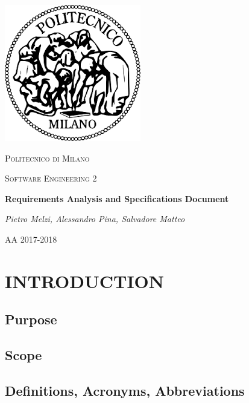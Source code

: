 \documentclass[11pt]{report}
\begin{document}
	\begin{titlepage}
		\centering
		\includegraphics{logo.png}\par\vspace{1cm}
		{\scshape\LARGE Politecnico di Milano \par}
		\vspace{1cm}
		{\scshape\Large Software Engineering 2\par}
		\vspace{1.5cm}
		{\huge\bfseries Requirements Analysis and Specifications Document\par}
		\vspace{2cm}
		{\Large\itshape Pietro Melzi, Alessandro Pina, Salvadore Matteo\par}

		\vfill

		{\large AA 2017-2018\par}
	\end{titlepage}

	\tableofcontents{}

	\chapter{INTRODUCTION}
	\label{ch:INTRODUCTION}
	
		\section{Purpose}
		\label{sect:Purpose}
			
			
		\section{Scope}
		\label{sect:Scope}
			
			
			
		\section{Definitions, Acronyms, Abbreviations}
		\label{sect:Definitions, Acronyms, Abbreviations}
			
			
			
			
\end{document}
